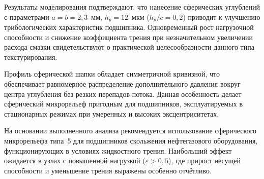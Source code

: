 Результаты моделирования подтверждают, что нанесение сферических углублений с параметрами $a = b = 2{,}3$~мм, $h_p = 12$~мкм ($h_p/c = 0{,}2$) приводит к улучшению трибологических характеристик подшипника. Одновременный рост нагрузочной способности и снижение коэффициента трения при незначительном увеличении расхода смазки свидетельствуют о практической целесообразности данного типа текстурирования.

Профиль сферической шапки обладает симметричной кривизной, что обеспечивает равномерное распределение дополнительного давления вокруг центра углубления без резких перепадов потока. Данная особенность делает сферический микрорельеф пригодным для подшипников, эксплуатируемых в стационарных режимах при умеренных и высоких эксцентриситетах.

На основании выполненного анализа рекомендуется использование сферического микрорельефа типа~5 для подшипников скольжения нефтегазового оборудования, функционирующих в условиях жидкостного трения. Наибольший эффект ожидается в узлах с повышенной нагрузкой ($\varepsilon > 0{,}5$), где прирост несущей способности и уменьшение трения выражены особенно отчётливо.

